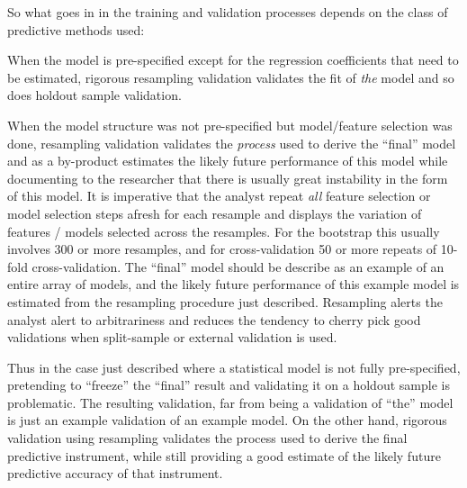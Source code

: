 So what goes in in the training and validation processes depends on
the class of predictive methods used:
\bi
\item When the model is pre-specified except for the regression
  coefficients that need to be estimated, rigorous resampling
  validation validates the fit of \emph{the} model and so does holdout
  sample validation.
\item When the model structure was not pre-specified but model/feature
  selection was done, resampling validation validates the
  \emph{process} used to derive the ``final'' model and as a
  by-product estimates the likely future performance of this model
  while documenting to the researcher that there is usually great
  instability in the form of this model.  It is imperative that the
  analyst repeat \emph{all} feature selection or model selection steps
  afresh for each resample and displays the variation of features /
  models selected across the resamples.  For the bootstrap this
  usually involves 300 or more resamples, and for cross-validation 50
  or more repeats of 10-fold cross-validation.  The ``final'' model
  should be describe as an example of an entire array of models, and
  the likely future performance of this example model is estimated
  from the resampling procedure just described.  Resampling alerts the
  analyst alert to arbitrariness and reduces the tendency to cherry
  pick good validations when split-sample or external validation is used.
\ei

Thus in the case just described where a statistical model is not fully
pre-specified, pretending to ``freeze'' the ``final'' result and
validating it on a holdout sample is problematic.  The resulting
validation, far from being a validation of ``the'' model is just an
example validation of an example model.  On the other hand, rigorous
validation using resampling validates the process used to derive the
final predictive instrument, while still providing a good estimate of
the likely future predictive accuracy of that instrument.

\def\apacue{0}
